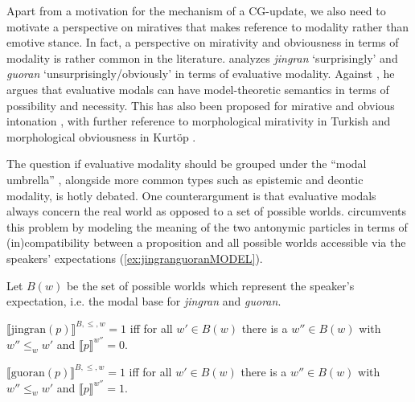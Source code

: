Apart from a motivation for the mechanism of a \ac{CG}-update, we also need to motivate a perspective on miratives that makes reference to modality rather than emotive stance. In fact, a perspective on mirativity and obviousness in terms of modality is rather common in the literature. \citet{Wu.2008} analyzes \textit{jingran} `surprisingly' and \textit{guoran} `unsurprisingly/obviously' in terms of evaluative modality. Against \citet{Hsieh.2005semanticsource,Hsieh.2006chinesemodalsnarrowsense,Hsieh.2006corpus}, he argues that evaluative modals can have model-theoretic semantics in terms of possibility and necessity. This has also been proposed for mirative and obvious intonation \citep{Reich.2018}, with further reference to morphological mirativity in Turkish \citep{DeLancey.1997,DeLancey.2012} and morphological obviousness in Kurtöp \citep[597--598]{Hyslop.2011}.

The question if evaluative modality should be grouped under the ``modal umbrella'' \citep[2]{Nuyts.2006}, alongside more common types such as epistemic and deontic modality, is hotly debated. One counterargument is that evaluative modals always concern the real world as opposed to a set of possible worlds. \citet{Wu.2008} circumvents this problem by modeling the meaning of the two antonymic particles in terms of (in)compatibility between a proposition and all possible worlds accessible via the speakers' expectations (\ref{ex:jingranguoranMODEL}).


\begin{exe}
	\ex\label{ex:jingranguoranMODEL}
		Let $B(w)$ be the set of possible worlds which represent the speaker’s expectation, i.e. the modal base for \textit{jingran} and \textit{guoran}.
	\begin{xlist}
		\ex $\llbracket \text{jingran}(p) \rrbracket^{B,\leq,w}=1$ iff for all $w' \in B(w)$ there is a $w''\in B(w)$ with $w'' \leq_w w'$ and $\llbracket p \rrbracket^{w''}=0$.
		
		\ex $\llbracket \text{guoran} (p)\rrbracket^{B,\leq,w}=1$ iff for all $w' \in B(w)$ there is a $w'' \in B(w)$ with $w'' \leq_w w'$ and $\llbracket p \rrbracket^{w''}=1$.
	\end{xlist}
\end{exe}

